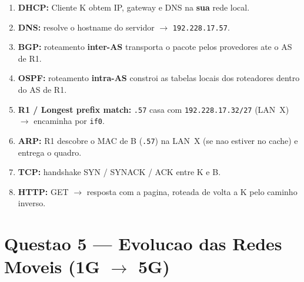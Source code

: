 \documentclass[11pt,a4paper]{article}
\begin{document}
\begin{resposta}
\begin{enumerate}[label=\textbf{\arabic*.}, noitemsep]
    \item \textbf{DHCP:} Cliente K obtem IP, gateway e DNS na \textbf{sua} rede local.
    \item \textbf{DNS:} resolve o hostname do servidor $\to$ \texttt{192.228.17.57}.
    \item \textbf{BGP:} roteamento \textbf{inter-AS} transporta o pacote pelos provedores ate o AS de R1.
    \item \textbf{OSPF:} roteamento \textbf{intra-AS} constroi as tabelas locais dos roteadores dentro do AS de R1.
    \item \textbf{R1 / Longest prefix match:} \texttt{.57} casa com \texttt{192.228.17.32/27} (LAN~X) $\to$ encaminha por \texttt{if0}.
    \item \textbf{ARP:} R1 descobre o MAC de B (\texttt{.57}) na LAN~X (se nao estiver no cache) e entrega o quadro.
    \item \textbf{TCP:} handshake SYN / SYNACK / ACK entre K e B.
    \item \textbf{HTTP:} GET $\to$ resposta com a pagina, roteada de volta a K pelo caminho inverso.
\end{enumerate}
\end{resposta}

\hrulefill

\section*{Questao 5 --- Evolucao das Redes Moveis (1G $\to$ 5G)}
\end{document}
